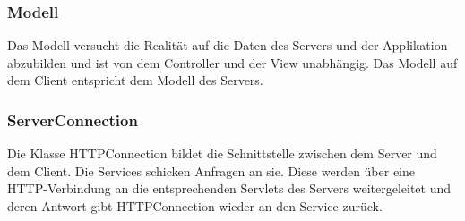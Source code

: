 \begin {center}
\end {center}

	
	\subsubsection{Modell}
Das Modell versucht die Realität auf die Daten des Servers und der Applikation abzubilden und ist von dem Controller und der View unabhängig. 
Das Modell auf dem Client entspricht dem Modell des Servers.

	\subsubsection{ServerConnection}
	Die Klasse HTTPConnection bildet die Schnittstelle zwischen dem Server und dem Client. Die Services schicken Anfragen an sie. Diese werden über eine HTTP-Verbindung an die entsprechenden Servlets des Servers weitergeleitet und deren Antwort gibt HTTPConnection wieder an den Service zurück.
		\newline


